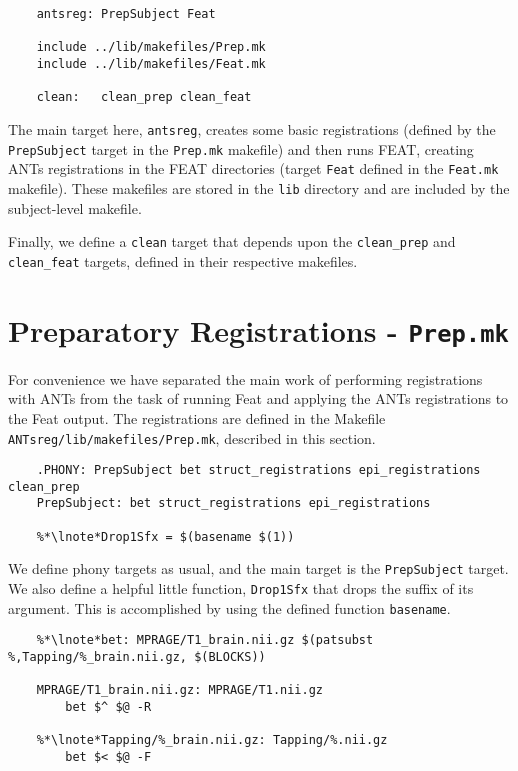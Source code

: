 \begin{lstlisting}
	antsreg: PrepSubject Feat

	include ../lib/makefiles/Prep.mk
	include ../lib/makefiles/Feat.mk

	clean:	 clean_prep clean_feat 
\end{lstlisting}
The main target here, \texttt{antsreg}, creates some basic
registrations (defined by the \texttt{PrepSubject} target in the
\texttt{Prep.mk} makefile) and then runs FEAT, creating ANTs
registrations in the FEAT directories (target \texttt{Feat} defined in
the \texttt{Feat.mk} makefile). These makefiles are stored in the
\texttt{lib} directory and are included by the subject-level makefile.

Finally, we define a \texttt{clean} target that depends upon the
\texttt{clean_prep} and \texttt{clean_feat} targets, defined in their
respective makefiles.

\section{Preparatory Registrations - \texttt{Prep.mk}}

For convenience we have separated the main work of performing
registrations with ANTs from the task of running Feat and applying the
ANTs registrations to the Feat output. The registrations are defined
in the Makefile \texttt{ANTsreg/lib/makefiles/Prep.mk}, described in
this section.

\begin{lstlisting}
	.PHONY: PrepSubject bet struct_registrations epi_registrations clean_prep
	PrepSubject: bet struct_registrations epi_registrations 

	%*\lnote*Drop1Sfx = $(basename $(1))
\end{lstlisting}
We define phony targets as usual, and the main target is the
\texttt{PrepSubject} target.  We also define a helpful little
function, \texttt{Drop1Sfx} that drops the suffix of its
argument. This is accomplished by using the \maken{} defined function
\texttt{basename}. 

\begin{lstlisting}
	%*\lnote*bet: MPRAGE/T1_brain.nii.gz $(patsubst %,Tapping/%_brain.nii.gz, $(BLOCKS))

	MPRAGE/T1_brain.nii.gz: MPRAGE/T1.nii.gz
		bet $^ $@ -R

	%*\lnote*Tapping/%_brain.nii.gz: Tapping/%.nii.gz
		bet $< $@ -F
\end{lstlisting}


